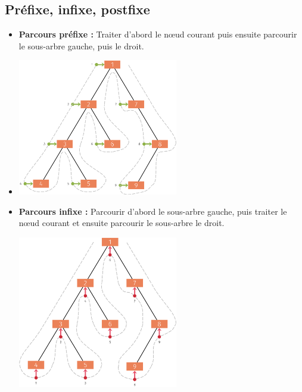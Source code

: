 \documentclass[10pt,firamath,cours]{nsi}
\begin{document}
\subsection{Préfixe, infixe, postfixe}
\begin{itemize}
    \item \textbf{Parcours préfixe :} Traiter d'abord le n\oe ud courant puis ensuite parcourir le sous-arbre gauche, puis le droit.\\
    \item     \begin{center}
              \includegraphics[width=7cm]{img/prefixe.png}
          \end{center}
    \item \textbf{Parcours infixe :} Parcourir d'abord le  sous-arbre gauche, puis traiter le n\oe ud courant et ensuite parcourir le sous-arbre le droit.\\
          \begin{center}
              \includegraphics[width=7cm]{img/infixe.png}
          \end{center}
          

\end{itemize}
\end{document}
